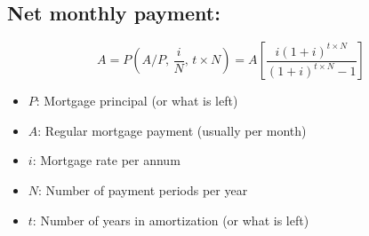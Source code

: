 \subsection{Net monthly payment:}
\begin{definition}
    \begin{equation}
        A = P \left(A/P, \, \frac{i}{N}, \, t \times N\right) = A \left[\frac{i (1+i)^{t \times N}}{(1+i)^{t \times N} - 1}\right]
    \end{equation}
    \begin{itemize}
        \item $P$: Mortgage principal (or what is left)
        \item $A$: Regular mortgage payment (usually per month)
        \item $i$: Mortgage rate per annum
        \item $N$: Number of payment periods per year
        \item $t$: Number of years in amortization (or what is left)
    \end{itemize}
\end{definition}

